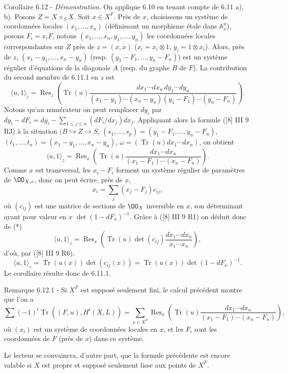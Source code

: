 \begin{statement}{Corollaire 6.12 -}
\emph{Démonstration}. On applique 6.10 en tenant compte de 6.11 a), b). Posons $Z=X\times_S X$. Soit $x\in X^F$. Près de $x$, choisissons un système de coordonnées locales $(x_1,\ldots,x_n)$ (définissant un morphisme étale dans $\mathbb{A}_s^n$), posons $F_i=x_iF$, notons $(x_1,\ldots,x_n,y_1,\ldots,y_n)$ les coordonnées locales correspondantes sur $Z$ près de $z=(x,x)$ ($x_i=x_i\otimes1$, $y_i=1\otimes x_i$). Alors, près de $z$, $(x_1-y_1,\ldots,x_n-y_n)$ (resp. $(y_1-F_1,\ldots,y_n-F_n)$) est un système régulier d'équations de la diagonale $A$ (resp. du graphe $B$ de $F$). La contribution du second membre de 6.11.1 en $z$ est
\[
\langle u,1\rangle_z=
\operatorname{Res}_z\left(\operatorname{Tr}(u)\frac{dx_1\cdots dx_n\,dy_1\cdots dy_n}{(x_1-y_1)\cdots(x_n-y_n)(y_1-F_1)\cdots(y_n-F_n)}\right).
\]
Notons qu'au numérateur on peut remplacer $dy_i$ par $dy_i-dF_i=dy_i-\sum_{1\le j\le n}(dF_i/dx_j)dx_j$. Appliquant alors la formule ([8] III 9 R3) à la situation $(B\hookrightarrow Z\to S$, $(s_1,\ldots,s_p)=(y_1-F_1,\ldots,y_n-F_n)$, $(t_1,\ldots,t_n)=(x_1-y_1,\ldots,x_n-y_n)$, $\omega=(\operatorname{Tr}(u)dx_1\cdots dx_n)$, on obtient
\begin{equation}
\tag{*}
\langle u,1\rangle_z=
\operatorname{Res}_x\left(\operatorname{Tr}(u)\frac{dx_1\cdots dx_n}{(x_1-F_1)\cdots(x_n-F_n)}\right).
\end{equation}
Comme $x$ est transversal, les $x_i-F_i$ forment un système régulier de paramètres de $\OO_{X,x}$, donc on peut écrire, près de $x$,
\[
x_i=\sum_j(x_j-F_j)c_{ij},
\]
où $(c_{ij})$ est une matrice de sections de $\OO_X$ inversible en $x$, son déterminant ayant pour valeur en $x$ $\det(1-dF_x)^{-1}$. Grâce à ([8] III 9 R1) on déduit donc de (*)
\[
\langle u,1\rangle_z=\operatorname{Res}_x\left(\operatorname{Tr}(u)\det(c_{ij})\frac{dx_1\cdots dx_n}{x_1\cdots x_n}\right),
\]
d'où, par ([8] III 9 R6),
\[
\langle u,1\rangle_z=\operatorname{Tr}(u(x))\det(c_{ij}(x))=\operatorname{Tr}(u(x))\det(1-dF_x)^{-1}.
\]
Le
corollaire résulte donc de 6.11.1.
\end{statement}

\begin{statement}{Remarque 6.12.1 -}
Si $X^F$ est supposé seulement fini, le calcul précédent montre que l'on a
\[
\sum(-1)^i\operatorname{Tr}((F,u),H^i(X,L))=
\sum_{x\in X^F}\operatorname{Res}_x\left(\operatorname{Tr}(u)\frac{dx_1\cdots dx_n}{(x_1-F_1)\cdots(x_n-F_n)}\right),
\]
où $(x_i)$ est un système de coordonnées locales en $x$, et les $F_i$ sont les coordonnées de $F$ (près de $x$) dans ce système.

Le lecteur se convaincra, d'autre part, que la formule précédente est encore valable si $X$ est propre et supposé seulement lisse aux points de $X^F$.
\end{statement}

